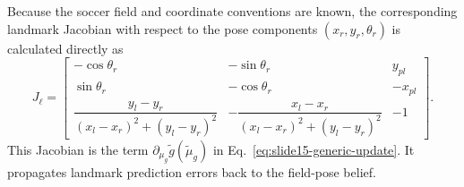 Because the soccer field and coordinate conventions are known, the corresponding landmark Jacobian with respect to the pose components $(x_r,y_r,\theta_r)$ is calculated directly as
\begin{equation}
    J_\ell
    =
    \begin{bmatrix}
        -\cos\theta_r & -\sin\theta_r & y_{pl} \\
        \sin\theta_r & -\cos\theta_r & -x_{pl} \\
        \dfrac{y_l-y_r}{(x_l-x_r)^2+(y_l-y_r)^2}
        &
        -\dfrac{x_l-x_r}{(x_l-x_r)^2+(y_l-y_r)^2}
        &
        -1
    \end{bmatrix}.
    \label{eq:landmark-jacobian}
\end{equation}
This Jacobian is the term $\partial_{\mu_g}\tilde{g}(\tilde{\mu}_g)$ in Eq.~\ref{eq:slide15-generic-update}. It propagates landmark prediction errors back to the field-pose belief.

\FloatBarrier
